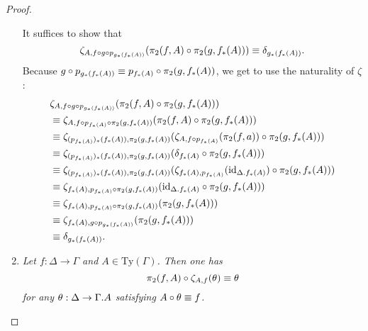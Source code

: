 \begin{proof}
\begin{enumerate}
It suffices to show that
\begin{equation*}
\zeta_{A,f\circ g\circ p_{g_\ast(f_\ast(A))}}(\pi_2(f,A)\circ\pi_2(g,f_\ast(A)))\equiv\delta_{g_\ast(f_\ast(A))}.
\end{equation*}
Because $g\circ p_{g_\ast(f_\ast(A))}\equiv p_{f_\ast(A)}\circ\pi_2(g,f_\ast(A))$, we get
to use the naturality of $\zeta$:
\begin{align*}
& \zeta_{A,f\circ g\circ p_{g_\ast(f_\ast(A))}}(\pi_2(f,A)\circ\pi_2(g,f_\ast(A))) \\
& \jdeq
\zeta_{A,f\circ p_{f_\ast(A)}\circ\pi_2(g,f_\ast(A))}(\pi_2(f,A)\circ\pi_2(g,f_\ast(A))) \\
& \jdeq
\zeta_{(p_{f_\ast(A)})_\ast(f_\ast(A)),\pi_2(g,f_\ast(A))}(\zeta_{A,f\circ p_{f_\ast(A)}}(\pi_2(f,a))\circ\pi_2(g,f_\ast(A))) \\
& \jdeq
\zeta_{(p_{f_\ast(A)})_\ast(f_\ast(A)),\pi_2(g,f_\ast(A))}(\delta_{f_\ast(A)}\circ\pi_2(g,f_\ast(A))) \\
& \jdeq
\zeta_{(p_{f_\ast(A)})_\ast(f_\ast(A)),\pi_2(g,f_\ast(A))}(\zeta_{f_\ast(A),p_{f_\ast(A)}}(\catid{\ctxext{\Delta}{f_\ast(A)}})\circ\pi_2(g,f_\ast(A))) \\
& \jdeq
\zeta_{f_\ast(A),p_{f_\ast(A)}\circ\pi_2(g,f_\ast(A))}(\catid{\ctxext{\Delta}{f_\ast(A)}}\circ\pi_2(g,f_\ast(A))) \\
& \jdeq
\zeta_{f_\ast(A),p_{f_\ast(A)}\circ\pi_2(g,f_\ast(A))}(\pi_2(g,f_\ast(A))) \\
& \jdeq
\zeta_{f_\ast(A),g\circ p_{g_\ast(f_\ast(A))}}(\pi_2(g,f_\ast(A)))\\
& \jdeq
\delta_{g_\ast(f_\ast(A))}.
\end{align*}
\item
\begingroup\it
Let $f:\Delta\to\Gamma$ and $A\in\mathrm{Ty}(\Gamma)$. Then one has 
\begin{equation*}
\pi_2(f,A)\circ\zeta_{A,f}(\theta)\equiv\theta
\end{equation*}
for any $\theta:\Delta\to\ctxext{\Gamma}{A}$ satisfying $A\circ\theta\equiv f$.
\endgroup
\medskip


\end{enumerate}
\end{proof}
